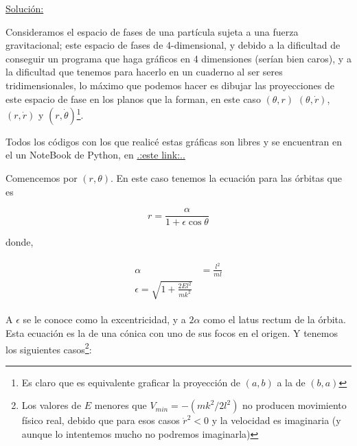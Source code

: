 \documentclass[a4paper,10pt]{article}
\numberwithin{equation}{section}
\begin{document}
\vspace{.3cm}

\underline{Solución:} \vspace{.3cm}

Consideramos el espacio de fases de una partícula sujeta a una fuerza gravitacional;
este espacio de fases de 4-dimensional, y debido a la dificultad de conseguir un 
programa que haga gráficos en 4 dimensiones (serían bien caros), y a la dificultad 
que tenemos para hacerlo en un cuaderno al ser seres tridimensionales, lo máximo que 
podemos hacer es dibujar las proyecciones de este espacio de fase en los planos que
la forman, en este caso $(\theta,r)$ $(\theta,\dot{r})$, $(r,\dot{r})$ y $(r,\dot{\theta})$\footnote{
Es claro que es equivalente graficar la proyección de $(a,b)$ a la de $(b,a)$}.

\vspace{.3cm}

Todos los códigos con los que realicé estas gráficas son libres y se encuentran en 
el un NoteBook de Python, en \href{https://github.com/FavioVazquez/MecanicaClasica-PCF/blob/master/Tarea3/Problema5.ipynb}{\color{blue}.:este link:..}

\vspace{.3cm}

Comencemos por $(r,\theta)$. En este caso tenemos la  ecuación para las órbitas que es

\begin{equation}
 r = \frac{\alpha}{1 + \epsilon \cos{\theta}} 
 \label{eq:rtita}
\end{equation}

donde,

\begin{align}
 \begin{split}
  \alpha &= \frac{l^2}{m l} \\
  \epsilon = \sqrt{1 + \frac{2El^2}{mk^2}}
 \end{split}
\end{align}

A $\epsilon$ se le conoce como la excentricidad, y a $2\alpha$ como el latus rectum 
de la órbita. Esta ecuación  es la de una cónica con uno de sus focos 
en el origen. Y tenemos los siguientes casos\footnote{Los valores de $E$ menores que 
$V_{min}= -(mk^2/2l^2)$ no producen movimiento físico real, debido que para esos 
casos $\dot{r}^2 < 0$ y la velocidad es imaginaria (y aunque lo intentemos mucho
no podremos imaginarla)}:
\end{document}

